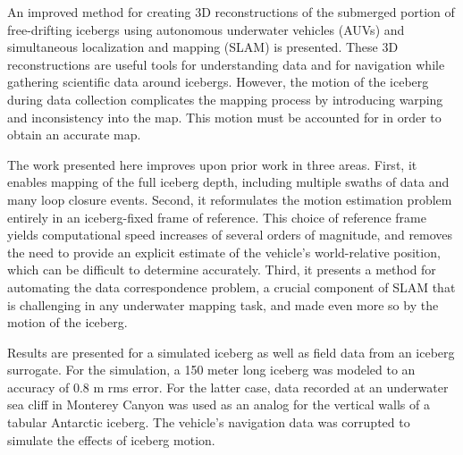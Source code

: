 
\noindent An improved method for creating 3D reconstructions of the submerged portion of free-drifting icebergs using autonomous underwater vehicles (AUVs) and simultaneous localization and mapping (SLAM) is presented. These 3D reconstructions are useful tools for understanding data and for navigation while gathering scientific data around icebergs. However, the motion of the iceberg during data collection complicates the mapping process by introducing warping and inconsistency into the map. This motion must be accounted for in order to obtain an accurate map. 

The work presented here improves upon prior work in three areas. First, it enables mapping of the full iceberg depth, including multiple swaths of data and many loop closure events. Second, it reformulates the motion estimation problem entirely in an iceberg-fixed frame of reference. This choice of reference frame yields computational speed increases of several orders of magnitude, and removes the need to provide an explicit estimate of the vehicle's world-relative position, which can be difficult to determine accurately. Third, it presents a method for automating the data correspondence problem, a crucial component of SLAM that is challenging in any underwater mapping task, and made even more so by the motion of the iceberg.

Results are presented for a simulated iceberg as well as field data from an iceberg surrogate.  For the simulation, a 150 meter long iceberg was modeled to an accuracy of 0.8 m rms error. For the latter case, data recorded at an underwater sea cliff in Monterey Canyon was used as an analog for the vertical walls of a tabular Antarctic iceberg. The vehicle's navigation data was corrupted to simulate the effects of iceberg motion.
